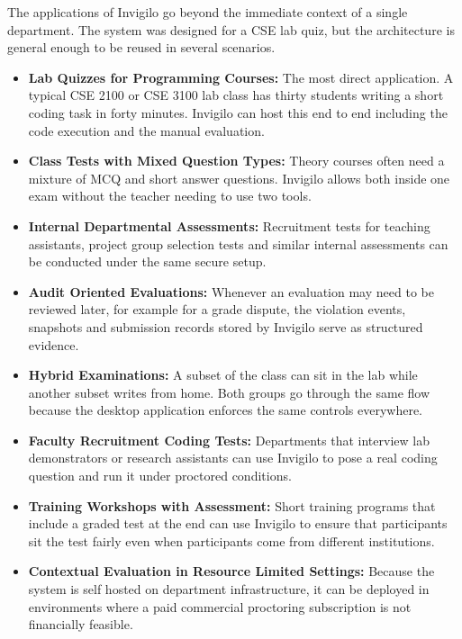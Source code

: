 \documentclass[12pt, a4paper]{report}
\begin{document}
\begin{justify}
  {\fontsize{12}{18}\selectfont
    The applications of Invigilo go beyond the immediate context of a single department. The system was designed for a CSE lab quiz, but the architecture is general enough to be reused in several scenarios.

    \begin{itemize}
        \item \textbf{Lab Quizzes for Programming Courses:} The most direct application. A typical CSE 2100 or CSE 3100 lab class has thirty students writing a short coding task in forty minutes. Invigilo can host this end to end including the code execution and the manual evaluation.

        \item \textbf{Class Tests with Mixed Question Types:} Theory courses often need a mixture of MCQ and short answer questions. Invigilo allows both inside one exam without the teacher needing to use two tools.

        \item \textbf{Internal Departmental Assessments:} Recruitment tests for teaching assistants, project group selection tests and similar internal assessments can be conducted under the same secure setup.

        \item \textbf{Audit Oriented Evaluations:} Whenever an evaluation may need to be reviewed later, for example for a grade dispute, the violation events, snapshots and submission records stored by Invigilo serve as structured evidence.

        \item \textbf{Hybrid Examinations:} A subset of the class can sit in the lab while another subset writes from home. Both groups go through the same flow because the desktop application enforces the same controls everywhere.

        \item \textbf{Faculty Recruitment Coding Tests:} Departments that interview lab demonstrators or research assistants can use Invigilo to pose a real coding question and run it under proctored conditions.

        \item \textbf{Training Workshops with Assessment:} Short training programs that include a graded test at the end can use Invigilo to ensure that participants sit the test fairly even when participants come from different institutions.

        \item \textbf{Contextual Evaluation in Resource Limited Settings:} Because the system is self hosted on department infrastructure, it can be deployed in environments where a paid commercial proctoring subscription is not financially feasible.
    \end{itemize}
  }
\end{justify}
\end{document}
